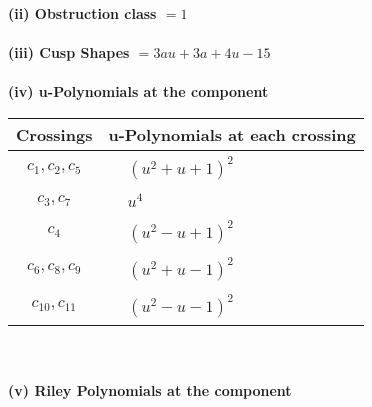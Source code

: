 \documentclass[1p]{elsarticle_modified}
\theoremstyle{definition}
\begin{document}
\flushleft \textbf{(ii) Obstruction class $= 1$}\\~\\
\flushleft \textbf{(iii) Cusp Shapes $= 3 a u+3 a+4 u-15$}\\~\\
\newpage\renewcommand{\arraystretch}{1}
\flushleft \textbf{(iv) u-Polynomials at the component}\newline \\
\begin{tabular}{m{50pt}|m{274pt}}
Crossings & \hspace{64pt}u-Polynomials at each crossing \\
\hline $$\begin{aligned}c_{1},c_{2},c_{5}\end{aligned}$$&$\begin{aligned}
&(u^2+u+1)^2
\end{aligned}$\\
\hline $$\begin{aligned}c_{3},c_{7}\end{aligned}$$&$\begin{aligned}
&u^4
\end{aligned}$\\
\hline $$\begin{aligned}c_{4}\end{aligned}$$&$\begin{aligned}
&(u^2- u+1)^2
\end{aligned}$\\
\hline $$\begin{aligned}c_{6},c_{8},c_{9}\end{aligned}$$&$\begin{aligned}
&(u^2+u-1)^2
\end{aligned}$\\
\hline $$\begin{aligned}c_{10},c_{11}\end{aligned}$$&$\begin{aligned}
&(u^2- u-1)^2
\end{aligned}$\\
\hline
\end{tabular}\\~\\
\newpage\renewcommand{\arraystretch}{1}
\flushleft \textbf{(v) Riley Polynomials at the component}\newline \\
\end{document}

